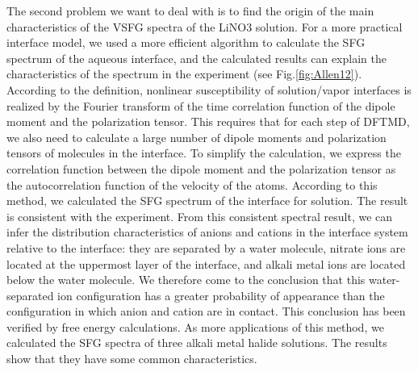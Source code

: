 The second problem we want to deal with is to find the origin of the main characteristics of the
VSFG spectra of the LiNO3 solution.
For a more practical interface model, we used a more efficient algorithm to calculate the SFG spectrum of the aqueous interface, 
and the calculated results can explain the characteristics of the spectrum in the experiment (see Fig.\ref{fig:Allen12}). 
According to the definition, nonlinear susceptibility of solution/vapor interfaces is realized by the Fourier transform of 
the time correlation function of the dipole moment and the polarization tensor. This requires that for each step of DFTMD, 
we also need to calculate a large number of dipole moments and polarization tensors of molecules in the interface. 
To simplify the calculation, we express the correlation function between the dipole moment and the polarization tensor 
as the autocorrelation function of the velocity of the atoms. According to this method, we calculated the SFG spectrum of the interface for \LiN solution. 
The result is consistent with the experiment. From this consistent spectral result, we can infer the distribution characteristics of anions 
and cations in the interface system relative to the interface: they are separated by a water molecule, nitrate ions are located at the uppermost layer of the interface, 
and alkali metal ions are located below the water molecule. We therefore come to the conclusion that this water-separated ion configuration 
has a greater probability of appearance than the configuration in which anion and cation are in contact.
This conclusion has been verified by free energy calculations. 
As more applications of this method, we calculated the SFG spectra of three alkali metal halide solutions. 
The results show that they have some common characteristics. 

